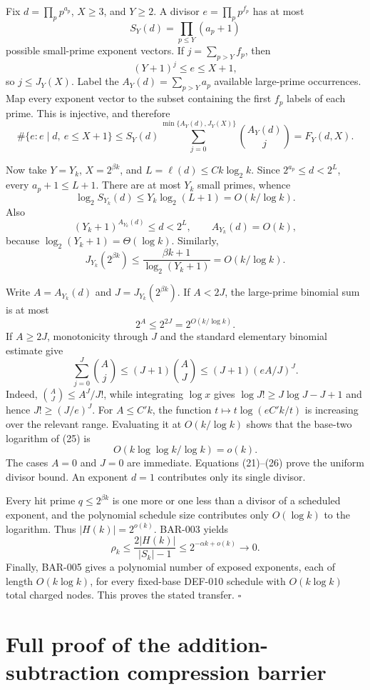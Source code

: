 \documentclass[11pt]{article}
\begin{document}
Fix \(d=\prod_p p^{a_p}\), \(X\ge3\), and \(Y\ge2\). A divisor
\(e=\prod_p p^{f_p}\) has at most
\[
S_Y(d)=\prod_{p\le Y}(a_p+1)
\]
possible small-prime exponent vectors. If
\(j=\sum_{p>Y}f_p\), then
\[
(Y+1)^j\le e\le X+1,
\]
so \(j\le J_Y(X)\). Label the \(A_Y(d)=\sum_{p>Y}a_p\) available
large-prime occurrences. Map every exponent vector to the subset containing
the first \(f_p\) labels of each prime. This is injective, and therefore
\[
\#\{e:e\mid d,\ e\le X+1\}
\le
S_Y(d)\sum_{j=0}^{\min\{A_Y(d),J_Y(X)\}}\binom{A_Y(d)}j
=F_Y(d,X).
\tag{21}
\]

Now take \(Y=Y_k\), \(X=2^{\beta k}\), and
\(L=\ell(d)\le Ck\log_2k\). Since \(2^{a_p}\le d<2^L\), every
\(a_p+1\le L+1\). There are at most \(Y_k\) small primes, whence
\[
\log_2S_{Y_k}(d)
\le Y_k\log_2(L+1)
=O(k/\log k).
\tag{22}
\]
Also
\[
(Y_k+1)^{A_{Y_k}(d)}\le d<2^L,\qquad
A_{Y_k}(d)=O(k),
\tag{23}
\]
because \(\log_2(Y_k+1)=\Theta(\log k)\). Similarly,
\[
J_{Y_k}(2^{\beta k})
\le\frac{\beta k+1}{\log_2(Y_k+1)}
=O(k/\log k).
\tag{24}
\]

Write \(A=A_{Y_k}(d)\) and \(J=J_{Y_k}(2^{\beta k})\). If \(A<2J\), the
large-prime binomial sum is at most
\[
2^A\le2^{2J}=2^{O(k/\log k)}.
\]
If \(A\ge2J\), monotonicity through \(J\) and the standard elementary
binomial estimate give
\[
\sum_{j=0}^J\binom Aj
\le(J+1)\binom AJ
\le(J+1)(eA/J)^J.
\tag{25}
\]
Indeed, \(\binom AJ\le A^J/J!\), while integrating \(\log x\) gives
\(\log J!\ge J\log J-J+1\) and hence \(J!\ge(J/e)^J\).
For \(A\le C'k\), the function
\(t\mapsto t\log(eC'k/t)\) is increasing over the relevant range. Evaluating
it at \(O(k/\log k)\) shows that the base-two logarithm of (25) is
\[
O(k\log\log k/\log k)=o(k).
\tag{26}
\]
The cases \(A=0\) and \(J=0\) are immediate. Equations (21)--(26) prove the
uniform divisor bound. An exponent \(d=1\) contributes only its single
divisor.

Every hit prime \(q\le2^{\beta k}\) is one more or one less than a divisor
of a scheduled exponent, and the polynomial schedule size contributes only
\(O(\log k)\) to the logarithm. Thus \(|H(k)|=2^{o(k)}\). BAR-003 yields
\[
\rho_k\le\frac{2|H(k)|}{|S_k|-1}
\le2^{-\alpha k+o(k)}\longrightarrow0.
\]
Finally, BAR-005 gives a polynomial number of exposed exponents, each of
length \(O(k\log k)\), for every fixed-base DEF-010 schedule with
\(O(k\log k)\) total charged nodes. This proves the stated transfer.
\(\square\)

\section{Full proof of the addition-subtraction compression barrier}
\end{document}
